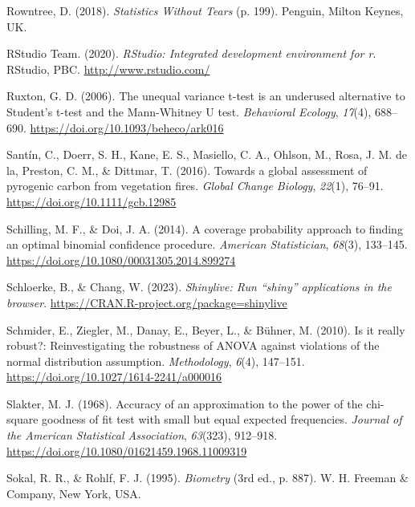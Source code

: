 \documentclass[
  openany]{krantz}
\newlength{\cslhangindent}
\newlength{\cslentryspacingunit} %
\newenvironment{CSLReferences}[2] %
 {%
  \setlength{\parindent}{0pt}
  \ifodd #1
  \let\oldpar\par
  \def\par{\hangindent=\cslhangindent\oldpar}
  \fi
  \setlength{\parskip}{#2\cslentryspacingunit}
 }%
 {}
\begin{document}
\begin{CSLReferences}{1}{0}
\leavevmode{}%
Rowntree, D. (2018). \emph{{Statistics Without Tears}} (p. 199). Penguin, Milton Keynes, UK.

\leavevmode{}%
RStudio Team. (2020). \emph{RStudio: Integrated development environment for r}. RStudio, PBC. \url{http://www.rstudio.com/}

\leavevmode{}%
Ruxton, G. D. (2006). {The unequal variance t-test is an underused alternative to Student's t-test and the Mann-Whitney U test}. \emph{Behavioral Ecology}, \emph{17}(4), 688--690. \url{https://doi.org/10.1093/beheco/ark016}

\leavevmode{}%
Santín, C., Doerr, S. H., Kane, E. S., Masiello, C. A., Ohlson, M., Rosa, J. M. de la, Preston, C. M., \& Dittmar, T. (2016). {Towards a global assessment of pyrogenic carbon from vegetation fires}. \emph{Global Change Biology}, \emph{22}(1), 76--91. \url{https://doi.org/10.1111/gcb.12985}

\leavevmode{}%
Schilling, M. F., \& Doi, J. A. (2014). A coverage probability approach to finding an optimal binomial confidence procedure. \emph{American Statistician}, \emph{68}(3), 133--145. \url{https://doi.org/10.1080/00031305.2014.899274}

\leavevmode{}%
Schloerke, B., \& Chang, W. (2023). \emph{Shinylive: Run {``shiny''} applications in the browser}. \url{https://CRAN.R-project.org/package=shinylive}

\leavevmode{}%
Schmider, E., Ziegler, M., Danay, E., Beyer, L., \& Bühner, M. (2010). Is it really robust?: Reinvestigating the robustness of ANOVA against violations of the normal distribution assumption. \emph{Methodology}, \emph{6}(4), 147--151. \url{https://doi.org/10.1027/1614-2241/a000016}

\leavevmode{}%
Slakter, M. J. (1968). Accuracy of an approximation to the power of the chi-square goodness of fit test with small but equal expected frequencies. \emph{Journal of the American Statistical Association}, \emph{63}(323), 912--918. \url{https://doi.org/10.1080/01621459.1968.11009319}

\leavevmode{}%
Sokal, R. R., \& Rohlf, F. J. (1995). \emph{{Biometry}} (3rd ed., p. 887). W. H. Freeman \& Company, New York, USA.


\end{CSLReferences}
\end{document}
